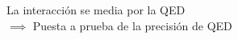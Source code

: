 \documentclass[preview]{standalone}
\begin{document}
\begin{center}
La interacción se media por la QED \\ $\implies$ Puesta a prueba de la precisión de QED
\end{center}
\end{document}
